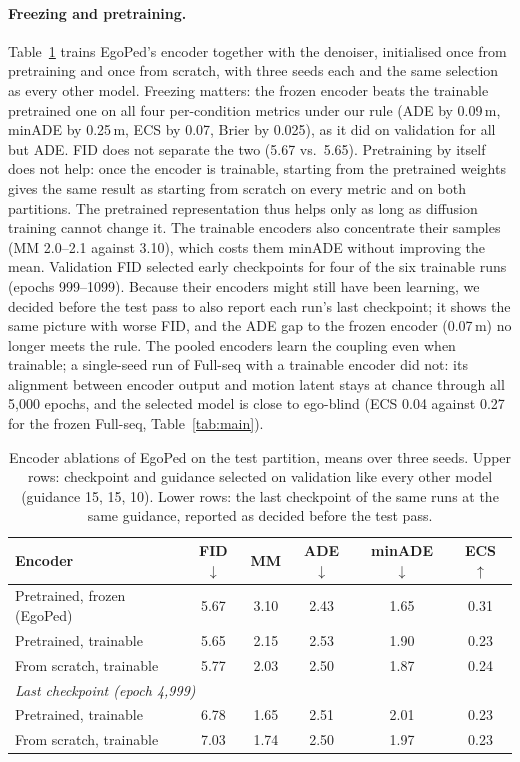 \documentclass{ieeeoj}
\newcommand{\method}{EgoPed\xspace}
\newcommand{\fullseq}{Full-seq\xspace}
\begin{document}
\paragraph{Freezing and pretraining.}
Table~\ref{tab:design} trains \method's encoder together with the denoiser, initialised once from pretraining and once from scratch, with three seeds each and the same selection as every other model.
Freezing matters: the frozen encoder beats the trainable pretrained one on all four per-condition metrics under our rule (ADE by 0.09\,m, minADE by 0.25\,m, ECS by 0.07, Brier by 0.025), as it did on validation for all but ADE. FID does not separate the two (5.67 vs.\ 5.65).
Pretraining by itself does not help: once the encoder is trainable, starting from the pretrained weights gives the same result as starting from scratch on every metric and on both partitions. The pretrained representation thus helps only as long as diffusion training cannot change it.
The trainable encoders also concentrate their samples (MM 2.0--2.1 against 3.10), which costs them minADE without improving the mean.
Validation FID selected early checkpoints for four of the six trainable runs (epochs 999--1099). Because their encoders might still have been learning, we decided before the test pass to also report each run's last checkpoint; it shows the same picture with worse FID, and the ADE gap to the frozen encoder (0.07\,m) no longer meets the rule.
The pooled encoders learn the coupling even when trainable; a single-seed run of \fullseq with a trainable encoder did not: its alignment between encoder output and motion latent stays at chance through all 5{,}000 epochs, and the selected model is close to ego-blind (ECS 0.04 against 0.27 for the frozen \fullseq, Table~\ref{tab:main}).

\begin{table}[t]
  \centering
  \caption{Encoder ablations of \method on the test partition, means over three seeds. Upper rows: checkpoint and guidance selected on validation like every other model (guidance 15, 15, 10). Lower rows: the last checkpoint of the same runs at the same guidance, reported as decided before the test pass.}
  \label{tab:design}
  \vspace{4pt}
  \footnotesize
  \setlength{\tabcolsep}{3pt}
  \begin{tabular}{lccccc}
    \toprule
    Encoder & FID $\downarrow$ & MM & ADE $\downarrow$ & minADE $\downarrow$ & ECS $\uparrow$ \\
    \midrule
    Pretrained, frozen (\method) & 5.67 & 3.10 & 2.43 & 1.65 & 0.31 \\
    Pretrained, trainable & 5.65 & 2.15 & 2.53 & 1.90 & 0.23 \\
    From scratch, trainable & 5.77 & 2.03 & 2.50 & 1.87 & 0.24 \\
    \midrule
    \multicolumn{6}{l}{\textit{Last checkpoint (epoch 4{,}999)}} \\
    Pretrained, trainable & 6.78 & 1.65 & 2.51 & 2.01 & 0.23 \\
    From scratch, trainable & 7.03 & 1.74 & 2.50 & 1.97 & 0.23 \\
    \bottomrule
  \end{tabular}
\end{table}
\end{document}
